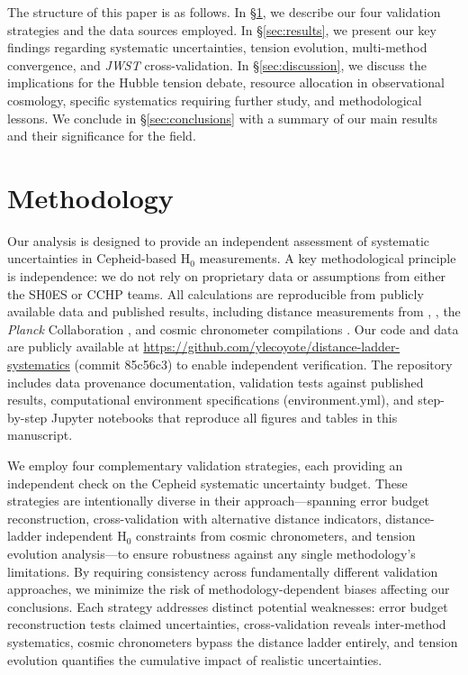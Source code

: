 \documentclass[preprint, linenumbers]{aastex701}
\begin{document}
The structure of this paper is as follows. In \S\ref{sec:methods}, we describe our four validation strategies and the data sources employed. In \S\ref{sec:results}, we present our key findings regarding systematic uncertainties, tension evolution, multi-method convergence, and \textit{JWST} cross-validation. In \S\ref{sec:discussion}, we discuss the implications for the Hubble tension debate, resource allocation in observational cosmology, specific systematics requiring further study, and methodological lessons. We conclude in \S\ref{sec:conclusions} with a summary of our main results and their significance for the field.


\section{Methodology} \label{sec:methods}

Our analysis is designed to provide an independent assessment of systematic uncertainties in Cepheid-based H$_0$ measurements. A key methodological principle is independence: we do not rely on proprietary data or assumptions from either the SH0ES or CCHP teams. All calculations are reproducible from publicly available data and published results, including distance measurements from \citet{Riess2022}, \citet{Freedman2025a}, the \textit{Planck} Collaboration \citep{Planck2018}, and cosmic chronometer compilations \citep{Moresco2022}. Our code and data are publicly available at \url{https://github.com/ylecoyote/distance-ladder-systematics} (commit 85c56c3) to enable independent verification. The repository includes data provenance documentation, validation tests against published results, computational environment specifications (environment.yml), and step-by-step Jupyter notebooks that reproduce all figures and tables in this manuscript.

We employ four complementary validation strategies, each providing an independent check on the Cepheid systematic uncertainty budget. These strategies are intentionally diverse in their approach---spanning error budget reconstruction, cross-validation with alternative distance indicators, distance-ladder independent H$_0$ constraints from cosmic chronometers, and tension evolution analysis---to ensure robustness against any single methodology's limitations. By requiring consistency across fundamentally different validation approaches, we minimize the risk of methodology-dependent biases affecting our conclusions. Each strategy addresses distinct potential weaknesses: error budget reconstruction tests claimed uncertainties, cross-validation reveals inter-method systematics, cosmic chronometers bypass the distance ladder entirely, and tension evolution quantifies the cumulative impact of realistic uncertainties.
\end{document}
